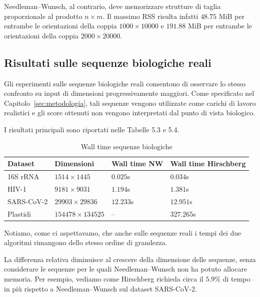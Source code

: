 Needleman--Wunsch, al contrario, deve memorizzare strutture di taglia proporzionale al prodotto $n  \times m$. Il massimo RSS
risulta infatti $48.75$ MiB per entrambe le orientazioni della coppia $1000  \times 10000$ e $191.88$ MiB per entrambe le
orientazioni della coppia $2000  \times 20000$.

\subsection{Risultati sulle sequenze biologiche reali}

Gli esperimenti sulle sequenze biologiche reali consentono di osservare lo stesso confronto su input di dimensioni progressivamente
maggiori. Come specificato nel Capitolo~\ref{sec:metodologia}, tali sequenze vengono utilizzate come carichi di lavoro realistici e gli
score ottenuti non vengono interpretati dal punto di vista biologico.

I risultati principali sono riportati nelle Tabelle 5.3 e 5.4.

\begin{table}[h]
    \centering
    \begin{tabular}{llll}
        \hline
        \textbf{Dataset} & \textbf{Dimensioni} & \textbf{Wall time NW} & \textbf{Wall time Hirschberg} \\
        \hline
        16S rRNA   & $1514  \times 1445$     & $0.025$s  & $0.034$s \\
        HIV-1      & $9181  \times 9031$     & $1.194$s  & $1.381$s \\
        SARS-CoV-2 & $29903  \times 29836$   & $12.233$s & $12.951$s \\
        Plastidi   & $154478  \times 134525$ & --        & $327.265$s \\
        \hline
    \end{tabular}
    \caption{Wall time sequenze biologiche}
    \label{tab:tempi_sequenze_bio}
\end{table}

Notiamo, come ci aspettavamo, che anche sulle sequenze reali i tempi dei due algoritmi rimangono dello stesso ordine di grandezza.

La differenza relativa diminuisce al crescere della dimensione delle sequenze, senza considerare le sequenze per le quali Needleman--Wunsch
non ha potuto allocare memoria. Per esempio, vediamo come Hirschberg richieda circa il $5.9$\% di tempo in più rispetto a Needleman--Wunsch
sul dataset SARS-CoV-2.

